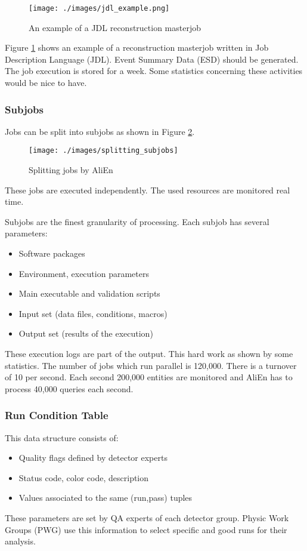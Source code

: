 \begin{figure}[h]
  \begin{center}
    \texttt{[image: ./images/jdl\_example.png]}
    \caption{An example of a JDL reconstruction masterjob}
    \label{fig:jdl_example}
  \end{center}
\end{figure}
Figure \ref{fig:jdl_example} shows an example of a reconstruction masterjob written in Job Description Language (JDL). Event Summary Data (ESD) should be generated. The job execution is stored for a week. Some statistics concerning these activities would be nice to have.

\subsubsection{Subjobs}
Jobs can be split into subjobs as shown in Figure \ref{fig:splitting_subjobs}.

\begin{figure}[h]
  \begin{center}
    \texttt{[image: ./images/splitting\_subjobs]}
    \caption{Splitting jobs by AliEn}
    \label{fig:splitting_subjobs}
  \end{center}
\end{figure}

These jobs are executed independently. The used resources are monitored real time.

Subjobs are the finest granularity of processing. Each subjob has several parameters:
\begin{itemize}
  \item Software packages
  \item Environment, execution parameters
  \item Main executable and validation scripts
  \item Input set (data files, conditions, macros)
  \item Output set (results of the execution)
\end{itemize}
These execution logs are part of the output. This hard work as shown by some statistics. The number of jobs which run parallel  is 120,000. There is a turnover of 10 per second. Each second 200,000 entities are monitored and AliEn has to process 40,000 queries each second.

\subsubsection{Run Condition Table}
This data structure consists of:
\begin{itemize}
  \item Quality flags defined by detector experts
  \item Status code, color code, description
  \item Values associated to the same (run,pass) tuples
\end{itemize}
These parameters are set by QA experts of each detector group. Physic Work Groups (PWG) use this information to select specific and good runs for their analysis.

